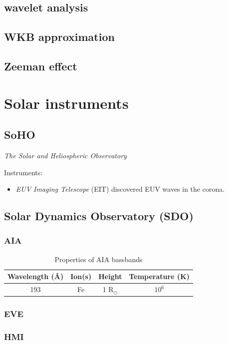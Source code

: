 \documentclass{article}
\begin{document}
\subsection{wavelet analysis}
\subsection{WKB approximation}
\subsection{Zeeman effect}


\section{Solar instruments}
\subsection{SoHO}
\emph{The Solar and Heliospheric Observatory}

Instruments:
\begin{itemize}
    \item \emph{EUV Imaging Telescope} (EIT) discovered EUV waves
        in the corona.
\end{itemize}

\subsection{Solar Dynamics Observatory (SDO)}
\subsubsection{AIA}
\begin{table}[h]
    \centering
    \begin{tabular}{c c c c}
        Wavelength (\AA{}) & Ion(s) & Height & Temperature (K)\\
        \hline
        193 & Fe & 1 R$_{\odot}$ & $10^{6}$\\
        \hline\hline
    \end{tabular}
    \caption{Properties of AIA bassbands}
\end{table}
\subsubsection{EVE}
\subsubsection{HMI}
\end{document}

